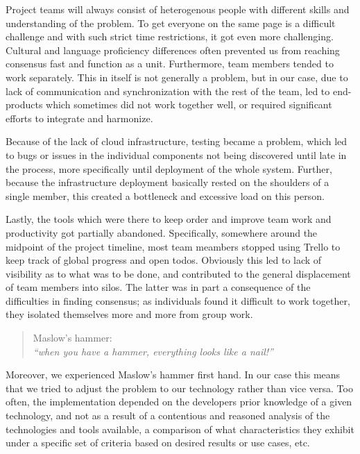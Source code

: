 Project teams will always consist of heterogenous people with different skills
and understanding of the problem. To get everyone on the same page is a difficult
challenge and with such strict time restrictions, it got even more challenging.
Cultural and language proficiency differences often prevented us from reaching
consensus fast and function as a unit. Furthermore, team members tended to work
separately. This in itself is not generally a problem, but in our case, due to
lack of communication and synchronization with the rest of the team, led to
end-products which sometimes did not work together well, or required
significant efforts to integrate and harmonize.

Because of the lack of cloud infrastructure, testing became a problem, which led to
bugs or issues in the individual components not being discovered until late in the process, more
specifically until deployment of the whole system. Further, because the
infrastructure deployment basically rested on the shoulders of a single member,
this created a bottleneck and excessive load on this person.

Lastly, the tools which were there to keep order and improve team work and productivity got
partially abandoned. Specifically, somewhere around the midpoint of the
project timeline, most team meambers stopped using Trello to keep track of
global progress and open todos. Obviously this led to lack of visibility as to
what was to be done, and contributed to the general displacement of team members into silos.
The latter was in part a consequence of the difficulties in finding consensus;
as individuals found it difficult to work together, they isolated themselves
more and more from group work.

\begin{quotation}
  Maslow's hammer: \\
  \emph{``when you have a hammer, everything looks like a nail!''}
\end{quotation}

Moreover, we experienced Maslow's hammer first hand. In our case this means
that we tried to adjust the problem to our technology rather than vice versa.
Too often, the implementation depended on the developers prior knowledge of a
given technology, and not as a result of a contentious and reasoned analysis of
the technologies and tools available, a comparison of what characteristics they
exhibit under a specific set of criteria based on desired results or use cases, etc.

